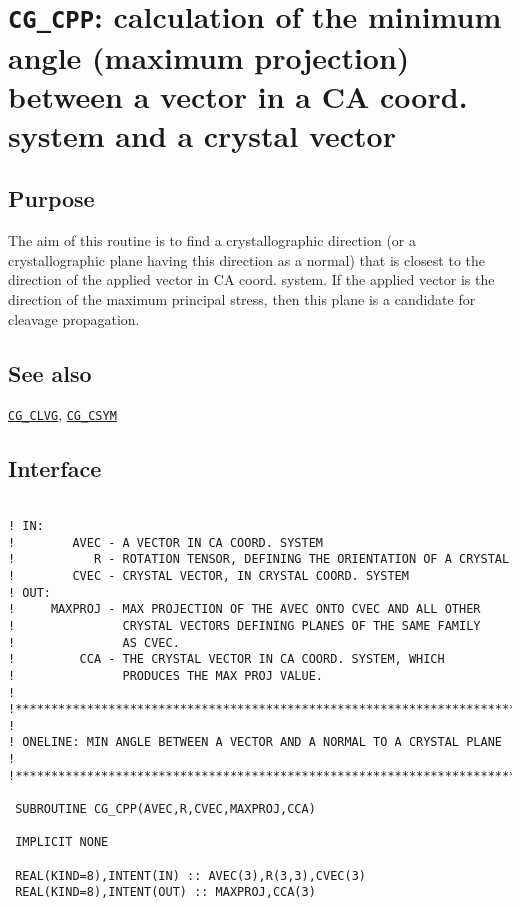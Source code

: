 \section{\texttt{CG\_CPP}:
 calculation of the minimum angle (maximum projection)
 between a vector in a CA coord. system and a crystal
 vector}

\label{sec:cg_cpp}

\subsection{Purpose}

The aim of this routine is to find a crystallographic
direction (or a crystallographic plane having this
direction as a normal)
that is closest to the direction of the
applied vector in CA coord. system. If the applied
vector is the direction of the maximum principal
stress, then this plane is a candidate for cleavage
propagation.

\subsection{See also}

\hyperref[sec:cg_clvg]{\texttt{CG\_CLVG}},
\hyperref[sec:cg_csym]{\texttt{CG\_CSYM}}

\subsection{Interface}

\begin{verbatim}

! IN:
!        AVEC - A VECTOR IN CA COORD. SYSTEM
!           R - ROTATION TENSOR, DEFINING THE ORIENTATION OF A CRYSTAL
!        CVEC - CRYSTAL VECTOR, IN CRYSTAL COORD. SYSTEM
! OUT:
!     MAXPROJ - MAX PROJECTION OF THE AVEC ONTO CVEC AND ALL OTHER
!               CRYSTAL VECTORS DEFINING PLANES OF THE SAME FAMILY
!               AS CVEC.
!         CCA - THE CRYSTAL VECTOR IN CA COORD. SYSTEM, WHICH
!               PRODUCES THE MAX PROJ VALUE.
!
!**********************************************************************73
!
! ONELINE: MIN ANGLE BETWEEN A VECTOR AND A NORMAL TO A CRYSTAL PLANE
!
!**********************************************************************73

 SUBROUTINE CG_CPP(AVEC,R,CVEC,MAXPROJ,CCA)

 IMPLICIT NONE

 REAL(KIND=8),INTENT(IN) :: AVEC(3),R(3,3),CVEC(3)
 REAL(KIND=8),INTENT(OUT) :: MAXPROJ,CCA(3)

\end{verbatim}

